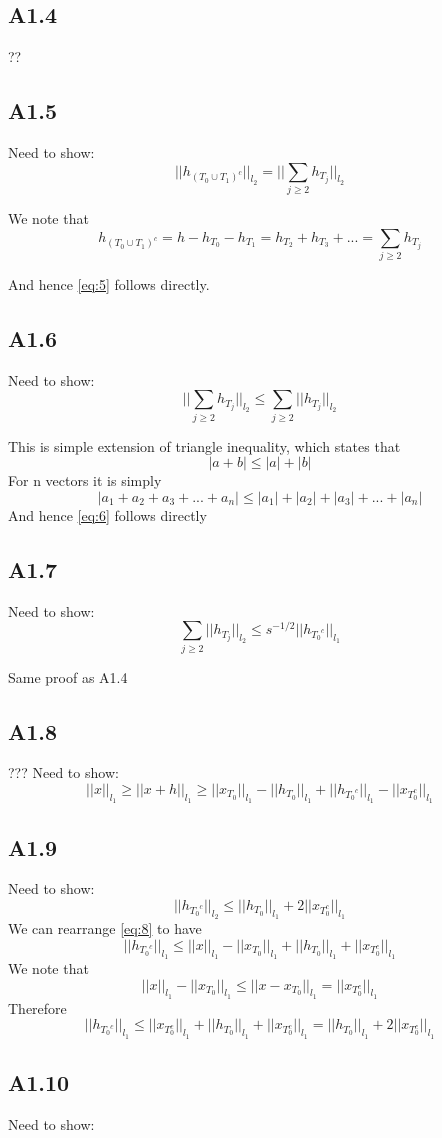 \documentclass{article}
\newcommand{\lone}[1]{
  ||#1||_{l_1}
}
\newcommand{\ltwo}[1]{
  ||#1||_{l_2}
}
\newcommand{\htj}[1]{
  h_{T_{#1}}
}
\newcommand{\htc}[1]{
  h_{{#1}^c}
}
\newcommand{\hto}[1]{
  h_{#1}
}
\begin{document}
\subsection*{A1.4}??

\subsection*{A1.5}
Need to show:
\begin{equation}
  \label{eq:5}
  \ltwo{\htc{(T_0 \cup T_1)}} = \ltwo{\sum_{j \ge 2}\htj{j}}
\end{equation}

We note that $$\htc{(T_0 \cup T_1)} = h - \hto{T_0} - \hto{T_1} = \hto{T_2} + \hto{T_3} + ... = \sum_{j \ge 2} \hto{T_j}$$

And hence \ref{eq:5} follows directly.

\subsection*{A1.6}
Need to show:
\begin{equation}
  \label{eq:6}
  \ltwo{\sum_{j \ge 2}{\htj{j}}} \le \sum_{j \ge 2} \ltwo{\htj{j}}
\end{equation}

This is simple extension of triangle inequality, which states that
$$|a+b| \le |a| + |b|$$
For n vectors it is simply
$$|a_1 + a_2 + a_3 +... +a_n| \le |a_1| + |a_2| + |a_3| + ... + |a_n| $$
And hence \ref{eq:6} follows directly

\subsection*{A1.7}
Need to show:
\begin{equation}
  \label{eq:7}
  \sum_{j \ge 2} \ltwo{\htj{j}} \le s^{-1/2}\lone{\htc{T_0}}
\end{equation}

Same proof as A1.4

\subsection*{A1.8}
???
Need to show:
\begin{equation}
  \label{eq:8}
  \lone{x} \ge \lone{x+h} \ge \lone{x_{T_0}} - \lone{\hto{T_0}} + \lone{\htc{T_0}} - \lone{x_{T_0^c}}
\end{equation}

\subsection*{A1.9}
Need to show:
\begin{equation}
  \label{eq:9}
  \ltwo{\htc{T_0}} \le \lone{\hto{T_0}} + 2\lone{x_{T_0^c}}
\end{equation}
We can rearrange \ref{eq:8} to have
$$\lone{\htc{T_0}} \le \lone{x} - \lone{x_{T_0}} + \lone{\hto{T_0}} + \lone{x_{T_0^c}}$$
We note that
$$\lone{x} - \lone{x_{T_0}} \le \lone{x - x_{T_0}} = \lone{x_{T_0^c}}$$
Therefore
$$\lone{\htc{T_0}} \le \lone{x_{T_0^c}} + \lone{\hto{T_0}} + \lone{x_{T_0^c}} = \lone{\hto{T_0}} + 2\lone{x_{T_0^c}}$$

\subsection*{A1.10}
Need to show:
\begin{equation}
  \label{eq:10}
  
\end{equation}
\end{document}
